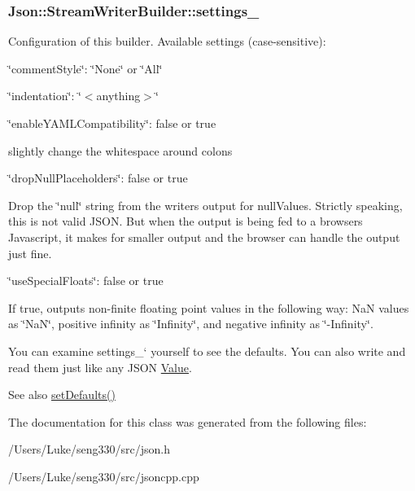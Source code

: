 \subsubsection[{settings\+\_\+}]{ Json\+::\+Stream\+Writer\+Builder\+::settings\+\_\+}\label{class_json_1_1_stream_writer_builder_a79bdf2e639a52f4e758c0b95bd1d3423}
Configuration of this builder. Available settings (case-\/sensitive)\+:
\begin{DoxyItemize}
\item \char`\"{}comment\+Style\char`\"{}\+: \char`\"{}\+None\char`\"{} or \char`\"{}\+All\char`\"{}
\item \char`\"{}indentation\char`\"{}\+: \char`\"{}$<$anything$>$\char`\"{}
\item \char`\"{}enable\+Y\+A\+M\+L\+Compatibility\char`\"{}\+: false or true
\begin{DoxyItemize}
\item slightly change the whitespace around colons
\end{DoxyItemize}
\item \char`\"{}drop\+Null\+Placeholders\char`\"{}\+: false or true
\begin{DoxyItemize}
\item Drop the \char`\"{}null\char`\"{} string from the writer\textquotesingle{}s output for null\+Values. Strictly speaking, this is not valid J\+S\+O\+N. But when the output is being fed to a browser\textquotesingle{}s Javascript, it makes for smaller output and the browser can handle the output just fine.
\end{DoxyItemize}
\item \char`\"{}use\+Special\+Floats\char`\"{}\+: false or true
\begin{DoxyItemize}
\item If true, outputs non-\/finite floating point values in the following way\+: Na\+N values as \char`\"{}\+Na\+N\char`\"{}, positive infinity as \char`\"{}\+Infinity\char`\"{}, and negative infinity as \char`\"{}-\/\+Infinity\char`\"{}.
\end{DoxyItemize}
\end{DoxyItemize}

You can examine \textquotesingle{}settings\+\_\+` yourself to see the defaults. You can also write and read them just like any J\+S\+O\+N \hyperlink{class_json_1_1_value}{Value}. \begin{DoxySeeAlso}{See also}
\hyperlink{class_json_1_1_stream_writer_builder_a53bf106b141e28637b01ad0ecd2acbf6}{set\+Defaults()} 
\end{DoxySeeAlso}


The documentation for this class was generated from the following files\+:\begin{DoxyCompactItemize}
\item 
/\+Users/\+Luke/seng330/src/json.\+h\item 
/\+Users/\+Luke/seng330/src/jsoncpp.\+cpp\end{DoxyCompactItemize}
